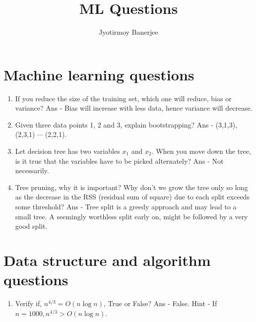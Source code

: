 \documentclass{article}
\title{ML Questions}
\author{Jyotirmoy Banerjee}
\begin{document}
\maketitle

\section{Machine learning questions}

\begin{enumerate}
\item If you reduce the size of the training set, which one will reduce, bias or variance? Ans - Bias will increase with less data, hence variance will decrease.
\item Given three data points 1, 2 and 3, explain bootstrapping? Ans - (3,1,3), (2,3,1) $\cdots$ (2,2,1).
\item Let decision tree has two variables $x_1$ and $x_2$. When you move down the tree, is it true that the variables have to be picked alternately? Ans - Not necessarily. 
\item Tree pruning, why it is important? Why don't we grow the tree only so long as the decrease in the RSS (residual sum of square) due to each split exceeds some threshold? Ans - Tree split is a greedy approach and may lead to a small tree. A seemingly worthless split early on, might be followed by a very good split.
\end{enumerate}

\section{Data structure and algorithm questions}

\begin{enumerate}
\item Verify if, $n^{4/3} = O(n \log n)$, True or False? Ans - False. Hint - If $n = 1000, n^{4/3} > O(n \log n)$.
\end{enumerate}
\end{document}
